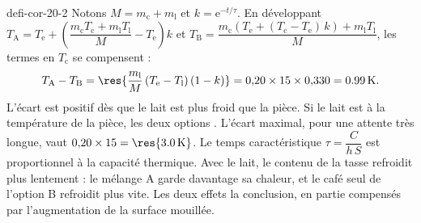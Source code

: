 \begin{blocEdition}{defi-cor-20-2}
\label{figedition-defi-cor-20-2-1}
Notons $M=m_\mathrm{c}+m_\mathrm{l}$ et $k=\mathrm{e}^{-t/\tau}$. En développant
$T_\mathrm{A}=T_\mathrm{e}+\left(\dfrac{m_\mathrm{c}T_\mathrm{c}+m_\mathrm{l}T_\mathrm{l}}{M}-T_\mathrm{e}\right)k$ et
$T_\mathrm{B}=\dfrac{m_\mathrm{c}\left(T_\mathrm{e}+(T_\mathrm{c}-T_\mathrm{e})\,k\right)+m_\mathrm{l}T_\mathrm{l}}{M}$, les termes en $T_\mathrm{c}$ se compensent :
\[T_\mathrm{A}-T_\mathrm{B}=\res{\frac{m_\mathrm{l}}{M}\,(T_\mathrm{e}-T_\mathrm{l})\,(1-k)}=0{,}20\times15\times0{,}330=\qty{0,99}{K}.\]
L'écart est positif dès que le lait est plus froid que la pièce. Si le lait est à la température de la pièce, les deux
options . L'écart maximal, pour une attente très longue, vaut $0{,}20\times15=\res{\qty{3,0}{K}}$.
Le temps caractéristique $\tau=\dfrac{C}{h\,S}$ est proportionnel à la capacité thermique. Avec le lait, le contenu de la tasse
refroidit plus lentement : le mélange A garde davantage sa chaleur, et le café seul de l'option B refroidit plus vite.
Les deux effets  la conclusion, en partie compensés par l'augmentation de la surface mouillée.
\end{blocEdition}


